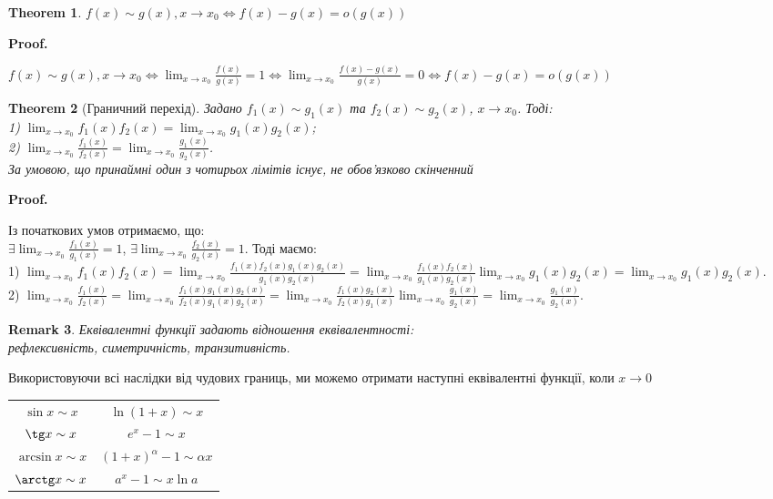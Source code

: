\documentclass[a4paper, 14pt]{article}
\makeatletter
\def\huge{\displaystyle}
\def\qed{$\blacksquare$}
\theoremstyle{theoremdd}
\newtheorem{theorem}{Theorem}[subsection]
\theoremstyle{theoremdd}
\theoremstyle{theoremdd}
\theoremstyle{theoremdd}
\theoremstyle{theoremdd}
\theoremstyle{theoremdd}
\newtheorem{remark}[theorem]{Remark}
\theoremstyle{theoremdd}
\theoremstyle{theoremdd}
\renewenvironment{proof}[1][Proof.\\]{\par
\pushQED{\hfill \qed}%
\normalfont \topsep6\p@\@plus6\p@\relax
\trivlist
\item\relax
{\bfseries
#1\@addpunct{.}}\hspace\labelsep\ignorespaces
}{%
\popQED\endtrivlist\@endpefalse
}
\makeatother
\begin{document}
\begin{theorem}
$f(x) \sim g(x), x \to x_0 \iff f(x)-g(x) = o(g(x))$
\end{theorem}

\begin{proof}
$f(x) \sim g(x), x \to x_0 \iff \huge \lim_{x \to x_0} \frac{f(x)}{g(x)} = 1 \iff \lim_{x \to x_0} \frac{f(x)-g(x)}{g(x)} = 0 \iff f(x)-g(x) = o(g(x))$
\end{proof}

\begin{theorem}[Граничний перехід]
Задано $f_1(x) \sim g_1(x)$ та $f_2(x) \sim g_2(x)$, $x \to x_0$. Тоді:\\
1) $\huge \lim_{x \to x_0} f_1(x) f_2(x) = \lim_{x \to x_0} g_1(x) g_2(x)$;\\
2) $\huge \lim_{x \to x_0} \frac{f_1(x)}{f_2(x)} = \lim_{x \to x_0} \frac{g_1(x)}{g_2(x)}$.\\
За умовою, що принаймні один з чотирьох лімітів існує, не обов'язково скінченний
\end{theorem}

\begin{proof}
Із початкових умов отримаємо, що:\\
$\huge \exists \lim_{x \to x_0} \frac{f_1(x)}{g_1(x)} = 1$, $\huge \exists \lim_{x \to x_0} \frac{f_2(x)}{g_2(x)} = 1$. Тоді маємо:\\
1) $\huge \lim_{x \to x_0} f_1(x) f_2(x) = \lim_{x \to x_0} \frac{f_1(x) f_2(x) g_1(x) g_2(x)}{g_1(x) g_2(x)} = \lim_{x \to x_0} \frac{f_1(x) f_2(x)}{g_1(x) g_2(x)} \lim_{x \to x_0} g_1(x) g_2(x) = \lim_{x \to x_0} g_1(x) g_2(x)$.\\
2) $\huge \lim_{x \to x_0} \frac{f_1(x)}{f_2(x)} = \lim_{x \to x_0} \frac{f_1(x)g_1(x)g_2(x)}{f_2(x)g_1(x)g_2(x)} = \lim_{x \to x_0} \frac{f_1(x)g_2(x)}{f_2(x)g_1(x)} \lim_{x \to x_0} \frac{g_1(x)}{g_2(x)} = \lim_{x \to x_0} \frac{g_1(x)}{g_2(x)}$.
\end{proof}

\begin{remark}
Еквівалентні функції задають відношення еквівалентності: \\
рефлексивність, симетричність, транзитивність.
\end{remark}

Використовуючи всі наслідки від чудових границь, ми можемо отримати наступні еквівалентні функції, коли $x \to 0$
\begin{center}
\begin{tabular}{ c c }
 $\sin x \sim x$ & $\ln(1+x) \sim x$ \\ 
 $\tg x \sim x$ & $e^x - 1 \sim x$ \\
 $\arcsin x \sim x$ & $(1+x)^\alpha - 1 \sim \alpha x$ \\
 $\arctg x \sim x$ & $a^x - 1 \sim x \ln a$ \\ 
\end{tabular}
\end{center}
\end{document}
